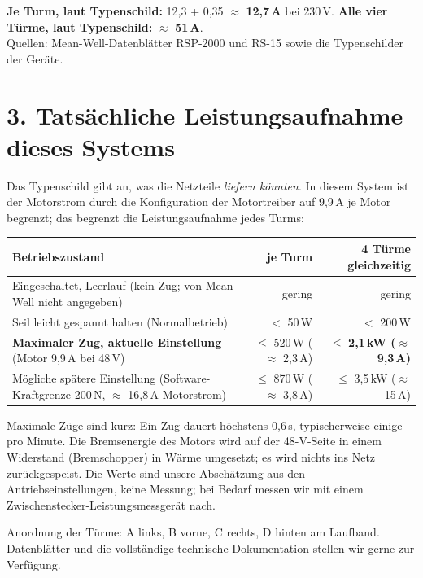 \documentclass[10pt,a4paper]{article}
\begin{document}
\smallskip
\textbf{Je Turm, laut Typenschild:} 12,3 + 0,35 $\approx$ \textbf{12,7\,A} bei 230\,V. \quad
\textbf{Alle vier Türme, laut Typenschild:} $\approx$ \textbf{51\,A}.\\
Quellen: Mean-Well-Datenblätter RSP-2000 und RS-15 sowie die Typenschilder der Geräte.

\section*{3. Tatsächliche Leistungsaufnahme dieses Systems}
Das Typenschild gibt an, was die Netzteile \emph{liefern könnten}. In diesem System ist der Motorstrom durch die Konfiguration
der Motortreiber auf 9,9\,A je Motor begrenzt; das begrenzt die Leistungsaufnahme jedes Turms:

\begin{tabularx}{\linewidth}{>{\raggedright\arraybackslash}X r r}
\toprule
Betriebszustand & je Turm & 4 Türme gleichzeitig \\
\midrule
Eingeschaltet, Leerlauf (kein Zug; von Mean Well nicht angegeben) & gering & gering \\
Seil leicht gespannt halten (Normalbetrieb) & $<$ 50\,W & $<$ 200\,W \\
\textbf{Maximaler Zug, aktuelle Einstellung} (Motor 9,9\,A bei 48\,V) & $\le$ 520\,W ($\approx$ 2,3\,A) & $\le$ \textbf{2,1\,kW ($\approx$ 9,3\,A)} \\
Mögliche spätere Einstellung (Software-Kraftgrenze 200\,N, $\approx$ 16,8\,A Motorstrom) & $\le$ 870\,W ($\approx$ 3,8\,A) & $\le$ 3,5\,kW ($\approx$ 15\,A) \\
\bottomrule
\end{tabularx}

\smallskip
Maximale Züge sind kurz: Ein Zug dauert höchstens 0,6\,s, typischerweise einige pro Minute. Die Bremsenergie des Motors wird
auf der 48-V-Seite in einem Widerstand (Bremschopper) in Wärme umgesetzt; es wird nichts ins Netz zurückgespeist. Die Werte
sind unsere Abschätzung aus den Antriebseinstellungen, keine Messung; bei Bedarf messen wir mit einem
Zwischenstecker-Leistungsmessgerät nach.

\smallskip
\small Anordnung der Türme: A links, B vorne, C rechts, D hinten am Laufband. Datenblätter und die vollständige technische
Dokumentation stellen wir gerne zur Verfügung.
\end{document}
